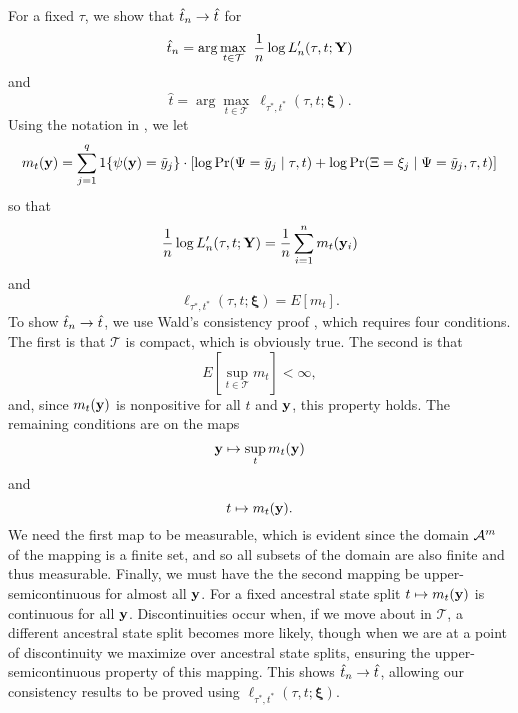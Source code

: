 For a fixed $\tau$, we show that $\hat{t}_n \rightarrow \hat{t}$ for
\[
\hat{t}_n = \arg\max_{t\in\mathcal{T}} \ \frac{1}{n}\log L_n'(\tau, t; \mathbf{Y})
\]
and
\[
\hat{t} = \arg\max_{t\in\mathcal{T}} \ \ell_{\tau^*,t^*}(\tau, t; \boldsymbol\xi).
\]
Using the notation in \citet{van1998asymptotic}, we let
\[
m_t(\mathbf{y}) = \sum_{j=1}^q 1\{\psi(\mathbf{y})=\tilde{y}_j\} \cdot [\log \Pr(\Psi=\tilde{y}_j \mid \tau, t) + \log \Pr(\Xi=\xi_j \mid \Psi=\tilde{y}_j , \tau, t)]
\]
so that
\[
\frac{1}{n}\log L_n'(\tau, t; \mathbf{Y}) = \frac{1}{n} \sum_{i=1}^n m_t(\mathbf{y}_i)
\]
and
\[
\ell_{\tau^*,t^*}(\tau, t; \boldsymbol\xi) = E[m_t].
\]
To show $\hat{t}_n \rightarrow \hat{t}$, we use Wald's consistency proof \citep[p. 48, Theorem 5.14 of ][]{van1998asymptotic}, which requires four conditions.
The first is that $\mathcal{T}$ is compact, which is obviously true.
The second is that
\[
E\left[\sup_{t\in\mathcal{T}} m_t\right] < \infty,
\]
and, since $m_t(\mathbf{y})$ is nonpositive for all $t$ and $\mathbf{y}$, this property holds.
The remaining conditions are on the maps
\[
\mathbf{y} \mapsto \sup_t m_t(\mathbf{y})
\]
and
\[
t \mapsto m_t(\mathbf{y}).
\]
We need the first map to be measurable, which is evident since the domain $\mathcal{A}^m$ of the mapping is a finite set, and so all subsets of the domain are also finite and thus measurable.
Finally, we must have the the second mapping be upper-semicontinuous for almost all $\mathbf{y}$.
For a fixed ancestral state split $t \mapsto m_t(\mathbf{y})$ is continuous for all $\mathbf{y}$.
Discontinuities occur when, if we move about in $\mathcal{T}$, a different ancestral state split becomes more likely, though when we are at a point of discontinuity we maximize over ancestral state splits, ensuring the upper-semicontinuous property of this mapping.
This shows $\hat{t}_n \rightarrow \hat{t}$, allowing our consistency results to be proved using $\ell_{\tau^*,t^*}(\tau, t; \boldsymbol\xi)$.

